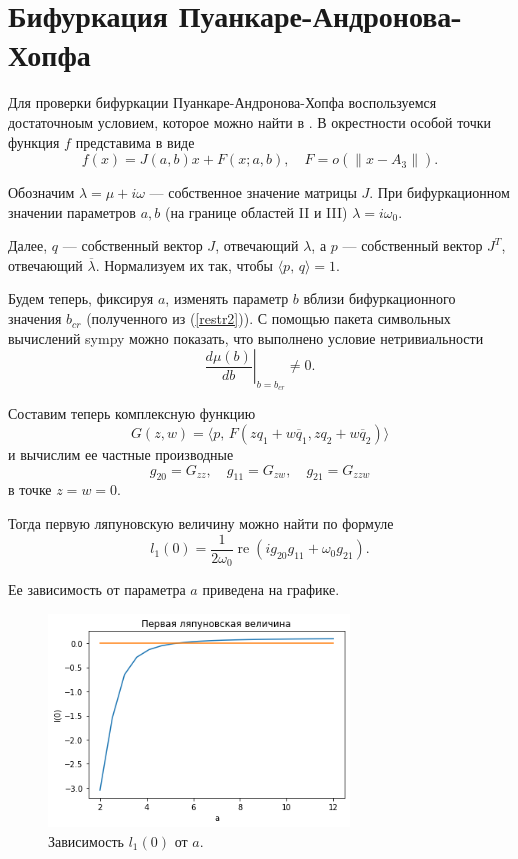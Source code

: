 \documentclass[16pt]{article}
\DeclareMathOperator{\Rea}{re}
\newcommand\Scal[2]{\langle #1,\, #2 \rangle}
\newcommand\Norm[1]{\left\| #1 \right\|}
\begin{document}
\section{Бифуркация Пуанкаре-Андронова-Хопфа}
Для проверки бифуркации Пуанкаре-Андронова-Хопфа воспользуемся достаточноым условием, которое можно найти в
\cite{bratus}. В окрестности особой точки функция $f$ представима в виде
$$ f(x) = J(a, b)x + F(x; a, b), \quad F = o(\Norm{x - A_3}).$$

Обозначим $\lambda = \mu + i\omega$ --- собственное значение матрицы $J$. При бифуркационном значении параметров
$a, b$ (на границе областей II и III) $\lambda = i\omega_0$.

Далее, $q$ --- собственный вектор $J$, отвечающий $\lambda$, а $p$ --- собственный вектор $J^T$, отвечающий
$\overline{\lambda}$. Нормализуем их так, чтобы $\Scal{p}{q} = 1$.

Будем теперь, фиксируя $a$, изменять параметр $b$ вблизи бифуркационного значения $b_{cr}$ (полученного из (\ref{restr2})).
С помощью пакета символьных вычислений sympy можно показать, что выполнено условие нетривиальности
$$\left.\dfrac{d\mu(b)}{db}\right|_{b = b_{cr}} \not= 0.$$

Составим теперь комплексную функцию
$$G(z,w) = \Scal{p}{F(zq_1+w\overline{q}_1, zq_2 + w\overline{q}_2)}$$
и вычислим ее частные производные
$$g_{20} = G_{zz}, \quad g_{11} = G_{zw}, \quad g_{21} = G_{zzw}$$
в точке $z = w = 0$.

Тогда первую ляпуновскую величину можно найти по формуле
$$l_1(0) = \dfrac{1}{2\omega_0}\Rea(ig_{20}g_{11} + \omega_0 g_{21}).$$

Ее зависимость от параметра $a$ приведена на графике.

\begin{figure}[h]
\begin{center}
\includegraphics[width=80mm]{lyap.png}
\caption{Зависимость $l_1(0)$ от $a$.}
\end{center}
\end{figure}
\end{document}
